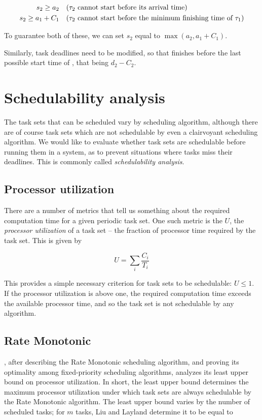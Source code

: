 \begin{align}
    s_2 \ge a_2 \quad &\text{(\ensuremath{\tau_2} cannot start before its arrival time)}\\
    s_2 \ge a_1 + C_1 \quad &\text{(\ensuremath{\tau_2} cannot start before the minimum finishing time of \ensuremath{\tau_1})}
\end{align}

To guarantee both of these, we can set $s_2$ equal to $\max(a_2, a_1 + C_1)$.

Similarly, task deadlines need to be modified, so that  finishes before the last possible start time of , that being $d_2 - C_2$.

\section{Schedulability analysis}
The task sets that can be scheduled vary by scheduling algorithm, although there are of course task sets which are not schedulable by even a clairvoyant scheduling algorithm. We would like to evaluate whether task sets are schedulable before running them in a system, as to prevent situations where tasks miss their deadlines. This is commonly called \emph{schedulability analysis}.

\subsection{Processor utilization}
There are a number of metrics that tell us something about the required computation time for a given periodic task set. One such metric is the $U$, the \emph{processor utilization} of a task set -- the fraction of processor time required by the task set. This is given by

\begin{equation}
U = \sum_i \dfrac{C_i}{T_i}
\end{equation}

This provides a simple necessary criterion for task sets to be schedulable: $U \le 1$. If the processor utilization is above one, the required computation time exceeds the available processor time, and so the task set is not schedulable by any algorithm.

\subsection{Rate Monotonic}
\textcite{Liu1973}, after describing the Rate Monotonic scheduling algorithm, and proving its optimality among fixed-priority scheduling algorithms, analyzes its least upper bound on processor utilization. In short, the least upper bound determines the maximum processor utilization under which task sets are always schedulable by the Rate Monotonic algorithm. The least upper bound varies by the number of scheduled tasks; for $m$ tasks, Liu and Layland determine it to be equal to

